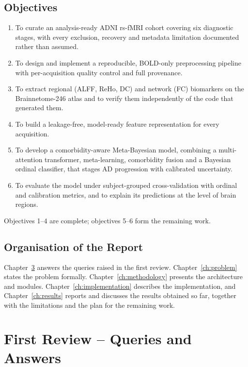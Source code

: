 \documentclass{ssnreview}
\begin{document}
\section{Objectives}
\begin{enumerate}[label=\arabic*.]
  \item To curate an analysis-ready ADNI rs-fMRI cohort covering six diagnostic
        stages, with every exclusion, recovery and metadata limitation
        documented rather than assumed.
  \item To design and implement a reproducible, BOLD-only preprocessing
        pipeline with per-acquisition quality control and full provenance.
  \item To extract regional (ALFF, ReHo, DC) and network (FC) biomarkers on the
        Brainnetome-246 atlas and to verify them independently of the code
        that generated them.
  \item To build a leakage-free, model-ready feature representation for every
        acquisition.
  \item To develop a comorbidity-aware Meta-Bayesian model, combining a
        multi-attention transformer, meta-learning, comorbidity fusion and a
        Bayesian ordinal classifier, that stages AD progression with calibrated
        uncertainty.
  \item To evaluate the model under subject-grouped cross-validation with
        ordinal and calibration metrics, and to explain its predictions at the
        level of brain regions.
\end{enumerate}
Objectives 1--4 are complete; objectives 5--6 form the remaining work.

\section{Organisation of the Report}
Chapter~\ref{ch:queries} answers the queries raised in the first review.
Chapter~\ref{ch:problem} states the problem formally. Chapter~\ref{ch:methodology}
presents the architecture and modules. Chapter~\ref{ch:implementation}
describes the implementation, and Chapter~\ref{ch:results} reports and discusses
the results obtained so far, together with the limitations and the plan for
the remaining work.

\chapter{First Review -- Queries and Answers}\label{ch:queries}
\end{document}

